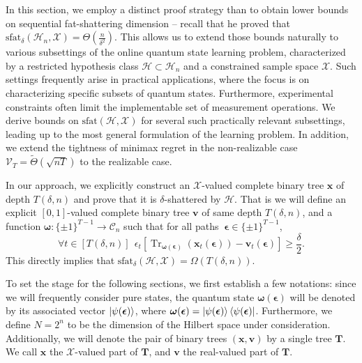 

In this section, we employ a distinct proof strategy than \citet{aaronson2019online} to obtain lower bounds on sequential fat-shattering dimension -- recall that he proved that $\text{sfat}_\delta (\mathcal{H}_n, \mathcal{X})=\Theta(\frac{n}{\delta^2})$. This allows us to extend those bounds naturally to various subsettings of the online quantum state learning problem,  characterized by a restricted hypothesis class $\mathcal{H}\subset\mathcal H_n$ and a constrained sample space $\mathcal X$. Such settings frequently arise in practical applications, where the focus is on characterizing specific subsets of quantum states. Furthermore, experimental constraints often limit the implementable set of measurement operations. We derive bounds on $\text{sfat} (\mathcal{H}, \mathcal{X})$ for several such practically relevant subsettings, leading up to the most general formulation of the learning problem. In addition, we extend the tightness of minimax regret in the non-realizable case $\mathcal{V}_T=\tilde \Theta(\sqrt{nT})$ \citep{aaronson2019online} to the realizable case.


In our approach, we explicitly construct an $\mathcal{X}$-valued complete binary tree $\mathbf{x}$ of depth $T(\delta, n)$ and prove that it is $\delta$-shattered by $\mathcal{H}$. That is we will define an explicit $[0,1]$-valued complete binary tree $\mathbf{v}$ of same depth $T(\delta, n)$, and a function $\boldsymbol \omega:\{\pm 1\}^{T-1}\rightarrow{\mathcal C}_n$ such that for all paths $\ \boldsymbol{\epsilon} \in \{\pm 1\}^{T-1}$,
\begin{equation}
     \forall t \in [T(\delta,n)] \ \ \epsilon_t [\operatorname{Tr}_{\boldsymbol \omega(\boldsymbol \epsilon)}(\mathbf{x}_t(\boldsymbol{\epsilon})) - \mathbf{v}_t (\boldsymbol{\epsilon})] \geq \frac{\delta}{2}.
\end{equation}
This directly implies that $\text{sfat}_\delta (\mathcal{H}, \mathcal{X}) = \Omega(T(\delta, n))$.

To set the stage for the following sections, we first establish a few notations: since we will frequently consider pure states, the quantum state $\boldsymbol\omega (\boldsymbol{\epsilon})$ will be denoted by its associated vector $\ket{\psi (\boldsymbol{\epsilon})}$, where $\boldsymbol\omega (\boldsymbol{\epsilon})=\ket{\psi(\boldsymbol{\epsilon})} \bra{\psi(\boldsymbol{\epsilon})}$. Furthermore, we define $N=2^n$  to be the dimension of the Hilbert space under consideration. Additionally, we will denote the pair of binary trees $(\mathbf{x}, \mathbf{v})$ by a single tree $\mathbf{T}$. We call $\mathbf{x}$ the $\mathcal{X}$-valued part of $\mathbf{T}$, and $\mathbf{v}$ the real-valued part of $\mathbf{T}$.

